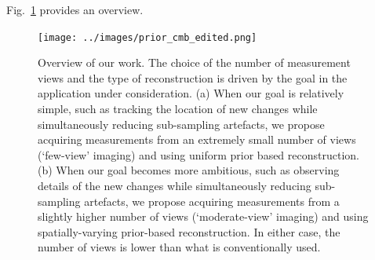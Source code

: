 \documentclass[journal]{IEEEtran}
\begin{document}
Fig.~\ref{fig:prior_overview} provides an overview.


 \begin{figure}[h]
\centering
	\texttt{[image: ../images/prior\_cmb\_edited.png]}
        \caption{Overview of our work. The choice of the number of
          measurement views and the type of reconstruction is driven
          by the goal in the application under consideration.  (a) When
          our goal is relatively simple, such as tracking the location
          of new changes while simultaneously reducing sub-sampling
          artefacts, we propose acquiring measurements from an
          extremely small number of views (`few-view' imaging) and
          using uniform prior based reconstruction. (b) When our goal
          becomes more ambitious, such as observing details of the new
          changes while simultaneously reducing sub-sampling
          artefacts, we propose acquiring measurements from a
          slightly higher number of views (`moderate-view' imaging)
          and using spatially-varying prior-based reconstruction. In
          either case, the number of views is lower than what is
          conventionally used.}
 \label{fig:prior_overview}
\end{figure}
\end{document}
